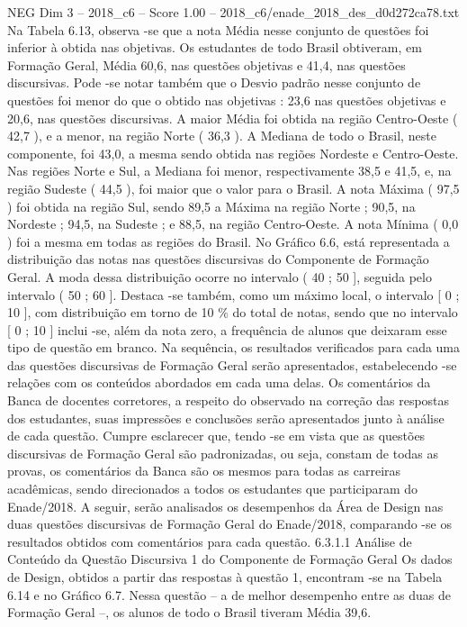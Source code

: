 \begin{textsample}{NEG Dim 3 – 2018\_c6 – Score 1.00 – 2018\_c6/enade\_2018\_des\_d0d272ca78.txt}
Na Tabela 6.13, observa -se que a nota Média nesse conjunto de questões foi inferior à obtida nas objetivas.
Os estudantes de todo Brasil obtiveram, em Formação Geral, Média 60,6, nas questões objetivas e 41,4, nas questões discursivas.
Pode -se notar também que o Desvio padrão nesse conjunto de questões foi menor do que o obtido nas objetivas : 23,6 nas questões objetivas e 20,6, nas questões discursivas.
A maior Média foi obtida na região Centro-Oeste ( 42,7 ), e a menor, na região Norte ( 36,3 ).
A Mediana de todo o Brasil, neste componente, foi 43,0, a mesma sendo obtida nas regiões Nordeste e Centro-Oeste.
Nas regiões Norte e Sul, a Mediana foi menor, respectivamente 38,5 e 41,5, e, na região Sudeste ( 44,5 ), foi maior que o valor para o Brasil.
A nota Máxima ( 97,5 ) foi obtida na região Sul, sendo 89,5 a Máxima na região Norte ; 90,5, na Nordeste ; 94,5, na Sudeste ; e 88,5, na região Centro-Oeste.
A nota Mínima ( 0,0 ) foi a mesma em todas as regiões do Brasil.
No Gráfico 6.6, está representada a distribuição das notas nas questões discursivas do Componente de Formação Geral.
A moda dessa distribuição ocorre no intervalo ( 40 ; 50 ], seguida pelo intervalo ( 50 ; 60 ].
Destaca -se também, como um máximo local, o intervalo [ 0 ; 10 ], com distribuição em torno de 10 \% do total de notas, sendo que no intervalo [ 0 ; 10 ] inclui -se, além da nota zero, a frequência de alunos que deixaram esse tipo de questão em branco.
Na sequência, os resultados verificados para cada uma das questões discursivas de Formação Geral serão apresentados, estabelecendo -se relações com os conteúdos abordados em cada uma delas.
Os comentários da Banca de docentes corretores, a respeito do observado na correção das respostas dos estudantes, suas impressões e conclusões serão apresentados junto à análise de cada questão.
Cumpre esclarecer que, tendo -se em vista que as questões discursivas de Formação Geral são padronizadas, ou seja, constam de todas as provas, os comentários da Banca são os mesmos para todas as carreiras acadêmicas, sendo direcionados a todos os estudantes que participaram do Enade/2018.
A seguir, serão analisados os desempenhos da Área de Design nas duas questões discursivas de Formação Geral do Enade/2018, comparando -se os resultados obtidos com comentários para cada questão. 6.3.1.1 Análise de Conteúdo da Questão Discursiva 1 do Componente de Formação Geral Os dados de Design, obtidos a partir das respostas à questão 1, encontram -se na Tabela 6.14 e no Gráfico 6.7.
Nessa questão – a de melhor desempenho entre as duas de Formação Geral –, os alunos de todo o Brasil tiveram Média 39,6.

\end{textsample}
